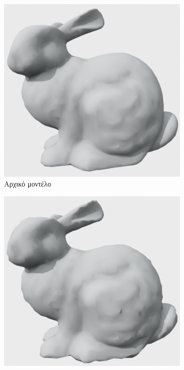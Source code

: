 \documentclass[draft]{article}
\begin{document}
\begin{figure}[h]
	\centering
	\begin{subfigure}{0.4\textwidth}
		\includegraphics[width=\textwidth]{"original_model.png"}
		\caption{Αρχικό μοντέλο}
	\end{subfigure}
	\begin{subfigure}{0.4\textwidth}
		\includegraphics[width=\textwidth]{"gaussian_noise.png"}

\end{subfigure}
\end{figure}
\end{document}
